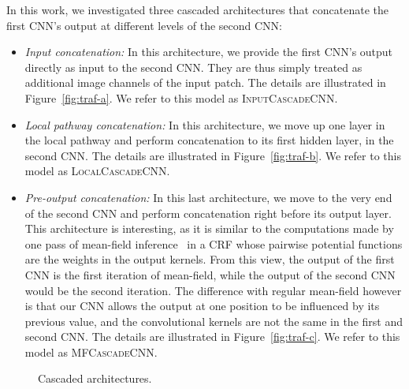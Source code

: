 \documentclass[final,5p,times,twocolumn]{elsarticle}
\begin{document}
In this work, we investigated three cascaded architectures that concatenate the first CNN's output at different levels of the second CNN:

\begin{itemize}

\item {\it Input concatenation:} In this architecture, we provide the first CNN's output directly as input to the second CNN. They are thus simply treated as additional image channels of the input patch. The details are illustrated in Figure~\ref{fig:traf-a}. We refer to this model as \textsc{InputCascadeCNN}.

\item {\it Local pathway concatenation:} In this architecture, we move up one layer in the local pathway and perform concatenation to its first hidden layer, in the second CNN. The details are illustrated in Figure~\ref{fig:traf-b}. We refer to this model as  \textsc{LocalCascadeCNN}. 

\item {\it Pre-output concatenation:} In this last architecture, we move to the very end of the second CNN and perform concatenation right before its output layer. This architecture is interesting, as it is similar to the computations made by one pass of mean-field inference~\citep{xing2002} in a CRF whose pairwise potential functions are the weights in the output kernels. From this view, the output of the first CNN is the first iteration of mean-field, while the output of the second CNN would be the second iteration. The difference with regular mean-field however is that our CNN allows the output at one position to be influenced by its previous value, and the convolutional kernels are not the same in the first and second CNN. The details are illustrated in Figure~\ref{fig:traf-c}. We refer to this model as \textsc{MFCascadeCNN}.

\end{itemize}






\begin{figure*}[htp]

\centering

\newline
{}
\newline
{}

\caption{Cascaded architectures.}

\label{fig:traf}

\end{figure*}
\end{document}
